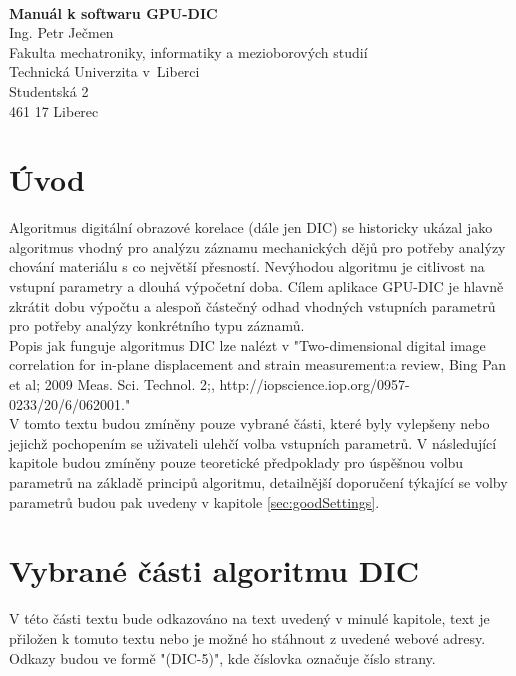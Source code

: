 \documentclass[a4paper,12pt]{article}
\date{September 13, 2013}
\begin{document}
\logo
\\\vspace{6pt}
\begin{center}
\large{\bfseries Manuál k softwaru GPU-DIC}
\\\vspace{1pc}
\small{
Ing. Petr Ječmen
\\\vspace{1pc}
Fakulta mechatroniky, informatiky a mezioborových studií\\
Technická Univerzita v~Liberci\\
Studentská 2\\
461 17 Liberec}
\end{center}
\newpage
\tableofcontents
\newpage
\section{Úvod}
Algoritmus digitální obrazové korelace (dále jen DIC) se historicky ukázal jako algoritmus vhodný pro analýzu záznamu mechanických dějů pro potřeby analýzy chování materiálu s co největší přesností. Nevýhodou algoritmu je citlivost na vstupní parametry a dlouhá výpočetní doba. Cílem aplikace GPU-DIC je  hlavně zkrátit dobu výpočtu a alespoň částečný odhad vhodných vstupních parametrů pro potřeby analýzy konkrétního typu záznamů.\\
Popis jak funguje algoritmus DIC lze nalézt v "Two-dimensional digital image correlation for in-plane displacement and strain measurement:a review, Bing Pan et al; 2009 Meas. Sci. Technol. 2;, http://iopscience.iop.org/0957-0233/20/6/062001."\\
V tomto textu budou zmíněny pouze vybrané části, které byly vylepšeny nebo jejichž pochopením se uživateli ulehčí volba vstupních parametrů. V následující kapitole budou zmíněny pouze teoretické předpoklady pro úspěšnou volbu parametrů na základě principů algoritmu, detailnější doporučení týkající se volby parametrů budou pak uvedeny v kapitole \ref{sec:goodSettings}.
\newpage
\section{Vybrané části algoritmu DIC}
V této části textu bude odkazováno na text uvedený v minulé kapitole, text je přiložen k tomuto textu nebo je možné ho stáhnout z uvedené webové adresy. Odkazy budou ve formě "(DIC-5)", kde číslovka označuje číslo strany.
\end{document}
